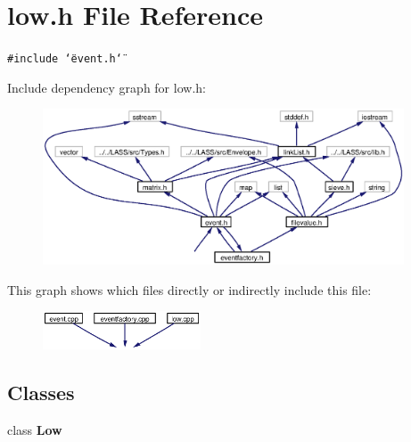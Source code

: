 \section{low.h File Reference}
\label{low_8h}
{\tt \#include \char`\"{}event.h\char`\"{}}\par


Include dependency graph for low.h:\begin{figure}[H]
\begin{center}
\leavevmode
\includegraphics[width=304pt]{low_8h__incl}
\end{center}
\end{figure}


This graph shows which files directly or indirectly include this file:\begin{figure}[H]
\begin{center}
\leavevmode
\includegraphics[width=133pt]{low_8h__dep__incl}
\end{center}
\end{figure}
\subsection*{Classes}
\begin{CompactItemize}
\item 
class {\bf Low}
\end{CompactItemize}
